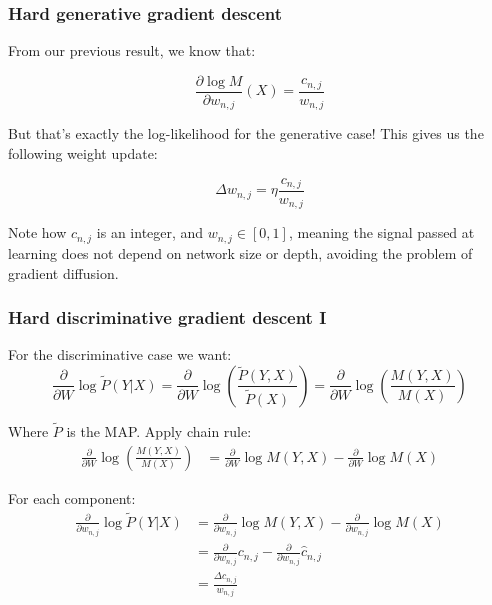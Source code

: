 \documentclass{beamer}
\newcommand{\ddspn}[2]{\frac{\partial#1}{\partial#2}}
\begin{document}
\begin{frame}
  \frametitle{Hard generative gradient descent}

  From our previous result, we know that:

  \begin{equation*}
    \ddspn{\log M}{w_{n,j}}(X)=\frac{c_{n,j}}{w_{n,j}}
  \end{equation*}

  But that's exactly the log-likelihood for the generative case! This gives us the following weight
  update:

  \begin{equation*}
    \Delta w_{n,j}=\eta\frac{c_{n,j}}{w_{n,j}}
  \end{equation*}

  Note how $c_{n,j}$ is an integer, and $w_{n,j}\in [0,1]$, meaning the signal passed at learning
  does not depend on network size or depth, avoiding the problem of gradient diffusion.
\end{frame}

\begin{frame}
  \frametitle{Hard discriminative gradient descent I}

  For the discriminative case we want:
  \begin{equation*}
    \ddspn{}{W}\log\tilde{P}(Y|X)=\ddspn{}{W}\log\left(\frac{\tilde{P}(Y,X)}{\tilde{P}(X)}\right)=
    \ddspn{}{W}\log\left(\frac{M(Y,X)}{M(X)}\right)
  \end{equation*}

  Where $\tilde{P}$ is the MAP. Apply chain rule:
  \begin{align*}
    \ddspn{}{W}\log\left(\frac{M(Y,X)}{M(X)}\right)&=\ddspn{}{W}\log M(Y,X)-\ddspn{}{W}\log M(X)
  \end{align*}

  For each component:
  \begin{align*}
    \ddspn{}{w_{n,j}}\log\tilde{P}(Y|X)&=\ddspn{}{w_{n,j}}\log M(Y,X)- \ddspn{}{w_{n,j}}\log M(X)\\
                                       &=\ddspn{}{w_{n,j}}c_{n,j}-\ddspn{}{w_{n,j}}\hat{c}_{n,j}\\
                                       &=\frac{\Delta c_{n,j}}{w_{n,j}}
  \end{align*}
\end{frame}
\end{document}
